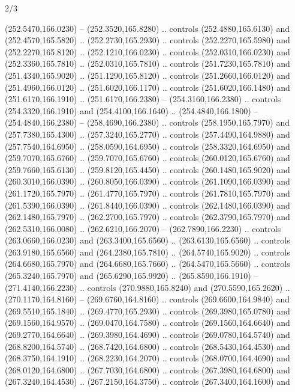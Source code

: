 \begin{flagdescription}{2/3}
\begin{scope}[xshift=0.5\flaglength,yshift=0.5\flagwidth,scale=\flagwidth/259.2]
\begin{scope}[y=0.8pt, x=0.8pt, yscale=-1,shift={(-243,-162)}]
      (252.5470,166.0230) -- (252.3520,165.8280) .. controls (252.4880,165.6130) and
      (252.4570,165.5820) .. (252.2730,165.2930) .. controls (252.2270,165.5980) and
      (252.2270,165.8120) .. (252.1210,166.0230) .. controls (252.0310,166.0230) and
      (252.3360,165.7810) .. (252.0310,165.7810) .. controls (251.7230,165.7810) and
      (251.4340,165.9020) .. (251.1290,165.8120) .. controls (251.2660,166.0120) and
      (251.4960,166.0120) .. (251.6020,166.1170) .. controls (251.6020,166.1480) and
      (251.6170,166.1910) .. (251.6170,166.2380) -- (254.3160,166.2380) .. controls
      (254.3320,166.1910) and (254.4100,166.1640) .. (254.4840,166.1800) --
      (254.4840,166.2380) -- (258.4690,166.2380) .. controls (258.1950,165.7970) and
      (257.7380,165.4300) .. (257.3240,165.2770) .. controls (257.4490,164.9880) and
      (257.7540,164.6950) .. (258.0590,164.6950) .. controls (258.3320,164.6950) and
      (259.7070,165.6760) .. (259.7070,165.6760) .. controls (260.0120,165.6760) and
      (259.7660,165.6130) .. (259.8120,165.4450) .. controls (260.1480,165.9020) and
      (260.3010,166.0390) .. (260.8050,166.0390) .. controls (261.1090,166.0390) and
      (261.1720,165.7970) .. (261.4770,165.7970) .. controls (261.7810,165.7970) and
      (261.5390,166.0390) .. (261.8440,166.0390) .. controls (262.1480,166.0390) and
      (262.1480,165.7970) .. (262.2700,165.7970) .. controls (262.3790,165.7970) and
      (262.5310,166.0080) .. (262.6210,166.2070) -- (262.7890,166.2230) .. controls
      (263.0660,166.0230) and (263.3400,165.6560) .. (263.6130,165.6560) .. controls
      (263.9180,165.6560) and (264.2380,165.7810) .. (264.5740,165.9020) .. controls
      (264.6680,165.7970) and (264.6680,165.7660) .. (264.5470,165.5660) .. controls
      (265.3240,165.7970) and (265.6290,165.9920) .. (265.8590,166.1910) --
      (271.4140,166.2230) .. controls (270.9880,165.8240) and (270.5590,165.2620) ..
      (270.1170,164.8160) -- (269.6760,164.8160) .. controls (269.6600,164.9840) and
      (269.5510,165.1840) .. (269.4770,165.2930) .. controls (269.3980,165.0780) and
      (269.1560,164.9570) .. (269.0470,164.7580) .. controls (269.1560,164.6640) and
      (269.2770,164.6640) .. (269.3980,164.4690) .. controls (269.0780,164.5740) and
      (268.8200,164.5740) .. (268.7420,164.6800) .. controls (268.5430,164.4530) and
      (268.3750,164.1910) .. (268.2230,164.2070) .. controls (268.0700,164.4690) and
      (268.0120,164.6800) .. (267.7030,164.6800) .. controls (267.3980,164.6800) and
      (267.3240,164.4530) .. (267.2150,164.3750) .. controls (267.3400,164.1600) and

\end{scope}
\end{scope}
\end{flagdescription}
